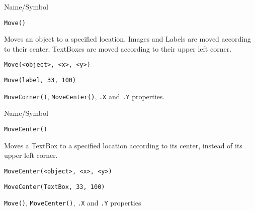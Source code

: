 \rl


\begin{desc}{Name/Symbol}
\item[Name/Symbol]	\verb+Move()+

\item[Description]	Moves an object to a specified location.  
		Images and Labels are moved according to their center; 
		TextBoxes are moved according to their upper left corner.

\item[Usage]
\begin{verbatim}
Move(<object>, <x>, <y>)
\end{verbatim}

\item[Example]	
\begin{verbatim}
Move(label, 33, 100)
\end{verbatim}

\item[See Also]	\verb+MoveCorner()+, \verb+MoveCenter()+, \verb+.X+ and \verb+.Y+ properties.
\end{desc}

\rl

\begin{desc}{Name/Symbol}
\item[Name/Symbol]	\verb+MoveCenter()+

\item[Description]	Moves a TextBox to a specified location
		according to its center, instead of its upper left corner.

\item[Usage]
\begin{verbatim}
MoveCenter(<object>, <x>, <y>)
\end{verbatim}

\item[Example]	
\begin{verbatim}
MoveCenter(TextBox, 33, 100)
\end{verbatim}

\item[See Also]	\verb+Move()+, \verb+MoveCenter()+, \verb+.X+ and \verb+.Y+ properties
\end{desc}

\rl


